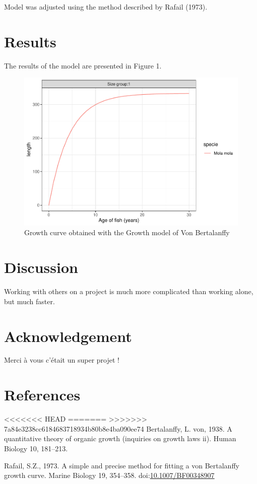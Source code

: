 \documentclass[]{elsarticle} %
\begin{document}
Model was adjusted using the method described by Rafail (1973).

\section{Results}\label{results}

The results of the model are presented in Figure 1.

\begin{figure}
\centering
\includegraphics{ElsevierRBertalanffyPackage_files/figure-latex/unnamed-chunk-1-1.pdf}
\caption{Growth curve obtained with the Growth model of Von Bertalanffy}
\end{figure}

\section{Discussion}\label{discussion}

Working with others on a project is much more complicated than working
alone, but much faster.

\section{Acknowledgement}\label{acknowledgement}

Merci à vous c'était un super projet !

\section*{References}\label{references}

\hypertarget{refs}{}
<<<<<<< HEAD
\leavevmode\hypertarget{ref-Bertalanffy1938}{}%
=======
\hypertarget{ref-Bertalanffy1938}{}
>>>>>>> 7a84e3238cc6184683718934b80b8e4ba090ee74
Bertalanffy, L. von, 1938. A quantitative theory of organic growth
(inquiries on growth laws ii). Human Biology 10, 181--213.

\hypertarget{ref-rafail_simple_1973}{}
Rafail, S.Z., 1973. A simple and precise method for fitting a von
Bertalanffy growth curve. Marine Biology 19, 354--358.
doi:\href{https://doi.org/10.1007/BF00348907}{10.1007/BF00348907}
\end{document}
